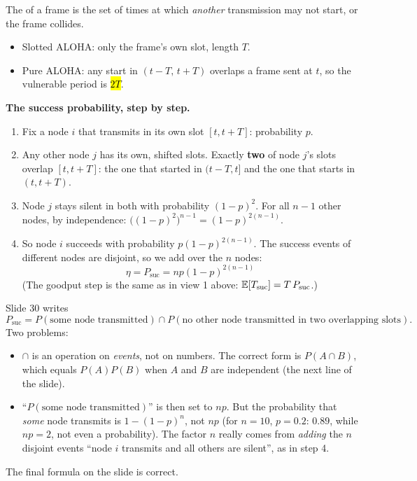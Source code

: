 \begin{defn}
The  of a frame is the set of times at which \emph{another} transmission may not start, or the frame collides.
\begin{itemize}
  \item Slotted ALOHA: only the frame's own slot, length $T$.
  \item Pure ALOHA: any start in $(t-T,\,t+T)$ overlaps a frame sent at $t$, so the vulnerable period is \hl{$2T$}.
\end{itemize}
\end{defn}

\textbf{The success probability, step by step.}
\begin{enumerate}
  \item Fix a node $i$ that transmits in its own slot $[t,t+T]$: probability $p$.
  \item Any other node $j$ has its own, shifted slots. Exactly \textbf{two} of node $j$'s slots overlap $[t,t+T]$: the one that started in $(t-T,t]$ and the one that starts in $(t,t+T)$.
  \item Node $j$ stays silent in both with probability $(1-p)^2$. For all $n-1$ other nodes, by independence: $\big((1-p)^2\big)^{n-1} = (1-p)^{2(n-1)}$.
  \item So node $i$ succeeds with probability $p(1-p)^{2(n-1)}$. The success events of different nodes are disjoint, so we add over the $n$ nodes:
        \[ \boxed{\ \eta = P_{\text{suc}} = np(1-p)^{2(n-1)}\ } \]
        (The goodput step is the same as in view 1 above: $\mathbb{E}[T_{\text{suc}}] = T\,P_{\text{suc}}$.)
\end{enumerate}

\begin{pitfall}
Slide 30 writes
\[ P_{\text{suc}} = P(\text{some node transmitted})\cap P(\text{no other node transmitted in two overlapping slots}). \]
Two problems:
\begin{itemize}
  \item $\cap$ is an operation on \emph{events}, not on numbers. The correct form is $P(A\cap B)$, which equals $P(A)P(B)$ when $A$ and $B$ are independent (the next line of the slide).
  \item ``$P(\text{some node transmitted})$'' is then set to $np$. But the probability that \emph{some} node transmits is $1-(1-p)^n$, not $np$ (for $n=10$, $p=0.2$: $0.89$, while $np = 2$, not even a probability).
        The factor $n$ really comes from \emph{adding} the $n$ disjoint events ``node $i$ transmits and all others are silent'', as in step 4.
\end{itemize}
The final formula on the slide is correct.
\end{pitfall}


